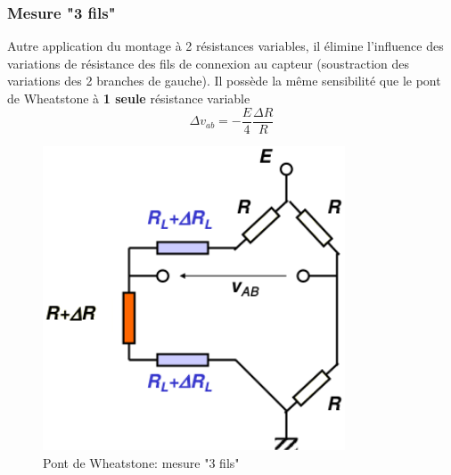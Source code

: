 \subsubsection{Mesure "3 fils"}
\begin{minipage}[t]{0.6\textwidth}
	Autre application du montage à 2 résistances variables, il élimine l'influence des variations de résistance des fils de connexion au capteur (soustraction des variations des 2 branches de gauche). Il possède la même sensibilité que le pont de Wheatstone à \textbf{1 seule} résistance variable
	\[\Delta v_{ab} = -\frac{E}{4}\frac{\Delta R}{R}\]
\end{minipage}\begin{minipage}[t]{0.4\textwidth}
\begin{figure}[H] 
	\centering 
	\vspace{-2.3cm}
	\includegraphics[width=0.8\textwidth,height=10\baselineskip,keepaspectratio]{ch4/image10} 
	\caption{Pont de Wheatstone: mesure "3 fils"} 
\end{figure}
\end{minipage}
